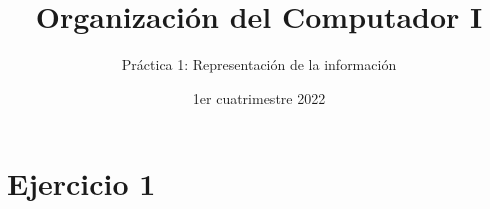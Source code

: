 

\title{Organización del Computador I}
\author{Práctica 1: Representación de la información}
\date{1er cuatrimestre 2022}



\maketitle
\tableofcontents
\newpage

\section{Ejercicio 1}

\subsection{}

